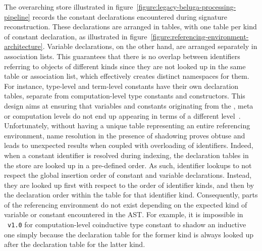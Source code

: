 The overarching store illustrated in figure~\ref{figure:legacy-beluga-processing-pipeline} records the constant declarations encountered during signature reconstruction.
These declarations are arranged in tables, with one table per kind of constant declaration, as illustrated in figure~\ref{figure:referencing-environment-architecture}.
Variable declarations, on the other hand, are arranged separately in association lists.
This guarantees that there is no overlap between identifiers referring to objects of different kinds since they are not looked up in the same table or association list, which effectively creates distinct namespaces for them.
For instance, \LF type-level and term-level constants have their own declaration tables, separate from computation-level type constants and constructors.
This design aims at ensuring that variables and constants originating from the \LF, meta or computation levels do not end up appearing in terms of a different level~\cite{germain2010implementation}.
Unfortunately, without having a unique table representing an entire referencing environment, name resolution in the presence of shadowing proves obtuse and leads to unexpected results when coupled with overloading of identifiers.
Indeed, when a constant identifier is resolved during indexing, the declaration tables in the store are looked up in a pre-defined order.
As such, identifier lookups to not respect the global insertion order of constant and variable declarations.
Instead, they are looked up first with respect to the order of identifier kinds, and then by the declaration order within the table for that identifier kind.
Consequently, parts of the referencing environment do not exist depending on the expected kind of variable or constant encountered in the \ac{AST}.
For example, it is impossible in \Beluga~\texttt{v1.0} for computation-level coinductive type constant to shadow an inductive one simply because the declaration table for the former kind is always looked up after the declaration table for the latter kind.

